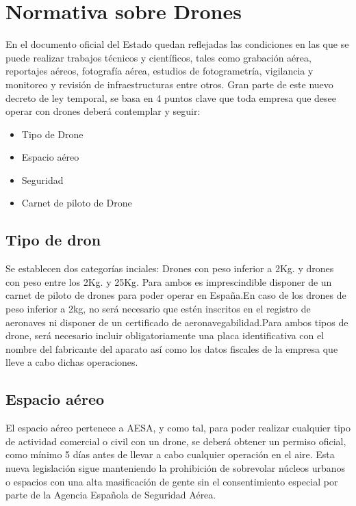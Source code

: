 \section{Normativa sobre Drones}
\label{sec:normativa}

En el documento oficial del Estado quedan reflejadas las condiciones en las que se puede realizar trabajos técnicos y científicos, tales como grabación aérea, reportajes aéreos, fotografía aérea, estudios de fotogrametría, vigilancia y monitoreo y revisión de infraestructuras entre otros. Gran parte de este nuevo decreto de ley temporal, se basa en 4 puntos clave que toda empresa que desee operar con drones deberá contemplar y seguir:

\begin{itemize}
\item Tipo de Drone
\item Espacio aéreo
\item Seguridad
\item Carnet de piloto de Drone
\end{itemize}

\subsection{Tipo de dron}
Se establecen dos categorías inciales: Drones con peso inferior a 2Kg. y drones con peso entre los 2Kg. y 25Kg. Para ambos es imprescindible disponer de un carnet de piloto de drones para poder operar en España.En caso de los drones de peso inferior a 2kg, no será necesario que estén inscritos en el registro de aeronaves ni disponer de un certificado de aeronavegabilidad.Para ambos tipos de drone, será necesario incluir obligatoriamente una placa identificativa con el nombre del fabricante del aparato así como los datos fiscales de la empresa que lleve a cabo dichas operaciones.

\subsection{Espacio aéreo}
El espacio aéreo pertenece a AESA, y como tal, para poder realizar cualquier tipo de actividad comercial o civil con un drone, se deberá obtener un permiso oficial, como mínimo 5 días antes de llevar a cabo cualquier operación en el aire. Esta nueva legislación sigue manteniendo la prohibición de sobrevolar núcleos urbanos o espacios con una alta masificación de gente sin el consentimiento especial por parte de la Agencia Española de Seguridad Aérea.

